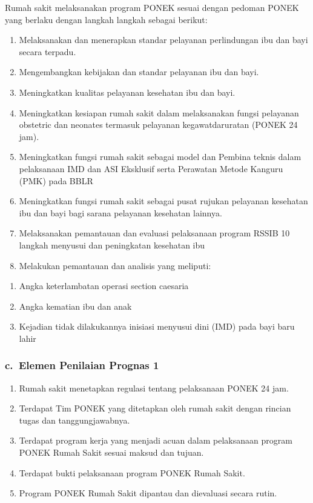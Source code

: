 \documentclass[
]{book}
\providecommand{\tightlist}{%
  \setlength{\itemsep}{0pt}\setlength{\parskip}{0pt}}
\begin{document}
Rumah sakit melaksanakan program PONEK sesuai dengan pedoman PONEK yang berlaku dengan langkah langkah sebagai berikut:

\begin{enumerate}
\def\labelenumi{\arabic{enumi}.}
\tightlist
\item
  Melaksanakan dan menerapkan standar pelayanan perlindungan ibu dan bayi secara terpadu.
\item
  Mengembangkan kebijakan dan standar pelayanan ibu dan bayi.
\item
  Meningkatkan kualitas pelayanan kesehatan ibu dan bayi.
\item
  Meningkatkan kesiapan rumah sakit dalam melaksanakan fungsi pelayanan obstetric dan neonates termasuk pelayanan kegawatdaruratan (PONEK 24 jam).
\item
  Meningkatkan fungsi rumah sakit sebagai model dan Pembina teknis dalam pelaksanaan IMD dan ASI Eksklusif serta Perawatan Metode Kanguru (PMK) pada BBLR
\item
  Meningkatkan fungsi rumah sakit sebagai pusat rujukan pelayanan kesehatan ibu dan bayi bagi sarana pelayanan kesehatan lainnya.
\item
  Melaksanakan pemantauan dan evaluasi pelaksanaan program RSSIB 10 langkah menyusui dan peningkatan kesehatan ibu
\item
  Melakukan pemantauan dan analisis yang meliputi:
\end{enumerate}

\begin{enumerate}
\def\labelenumi{\alph{enumi}.}
\tightlist
\item
  Angka keterlambatan operasi section caesaria
\item
  Angka kematian ibu dan anak
\item
  Kejadian tidak dilakukannya inisiasi menyusui dini (IMD) pada bayi baru lahir
\end{enumerate}

\hypertarget{c.-elemen-penilaian-prognas-1}{%
\subsubsection*{c.~Elemen Penilaian Prognas 1}\label{c.-elemen-penilaian-prognas-1}}

\begin{enumerate}
\def\labelenumi{\arabic{enumi}.}
\tightlist
\item
  Rumah sakit menetapkan regulasi tentang pelaksanaan PONEK 24 jam.
\item
  Terdapat Tim PONEK yang ditetapkan oleh rumah sakit dengan rincian tugas dan tanggungjawabnya.
\item
  Terdapat program kerja yang menjadi acuan dalam pelaksanaan program PONEK Rumah Sakit sesuai maksud dan tujuan.
\item
  Terdapat bukti pelaksanaan program PONEK Rumah Sakit.
\item
  Program PONEK Rumah Sakit dipantau dan dievaluasi secara rutin.
\end{enumerate}
\end{document}

